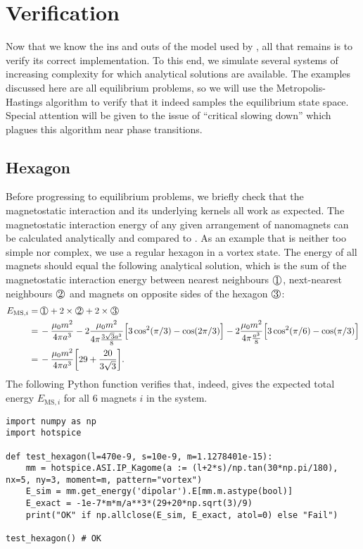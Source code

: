 \section{Verification} %
Now that we know the ins and outs of the model used by \hotspice, all that remains is to verify its correct implementation.
To this end, we simulate several systems of increasing complexity for which analytical solutions are available.
The examples discussed here are all equilibrium problems, so we will use the Metropolis-Hastings algorithm to verify that it indeed samples the equilibrium state space.
Special attention will be given to the issue of ``critical slowing down'' which plagues this algorithm near phase transitions.
\subsection{Hexagon}
Before progressing to equilibrium problems, we briefly check that the magnetostatic interaction and its underlying kernels all work as expected.
The magnetostatic interaction energy of any given arrangement of nanomagnets can be calculated analytically and compared to \hotspice.
As an example that is neither too simple nor complex, we use a regular hexagon in a vortex state. The energy of all magnets should equal the following analytical solution, which is the sum of the magnetostatic interaction energy between nearest neighbours $\circled{1}$, next-nearest neighbours $\circled{2}$ and magnets on opposite sides of the hexagon $\circled{3}$:
\begin{align*}
	E_{\mathrm{MS},i} =&\, \circled{1} + 2 \times \circled{2} + 2 \times \circled{3} \\
	=&\, -\frac{\mu_0 m^2}{4\pi a^3} -2\frac{\mu_0 m^2}{4\pi \frac{3 \sqrt{3} a^3}{8}} \Big[3\cos^2(\pi/3) - \cos(2\pi/3)\Big] -2\frac{\mu_0 m^2}{4\pi \frac{a^3}{8}} \Big[3\cos^2(\pi/6) - \cos(\pi/3)\Big] \\
	=&\, -\frac{\mu_0 m^2}{4\pi a^3} \bigg[29+\frac{20}{3\sqrt{3}}\bigg] \mathrm{.}
\end{align*}
The following Python function verifies that, indeed, \hotspice gives the expected total energy $E_{\mathrm{MS},i}$ for all 6 magnets $i$ in the system.
\begin{lstlisting}
import numpy as np
import hotspice

def test_hexagon(l=470e-9, s=10e-9, m=1.1278401e-15):
	mm = hotspice.ASI.IP_Kagome(a := (l+2*s)/np.tan(30*np.pi/180), nx=5, ny=3, moment=m, pattern="vortex")
	E_sim = mm.get_energy('dipolar').E[mm.m.astype(bool)]
	E_exact = -1e-7*m*m/a**3*(29+20*np.sqrt(3)/9)
	print("OK" if np.allclose(E_sim, E_exact, atol=0) else "Fail")

test_hexagon() # OK
\end{lstlisting}

